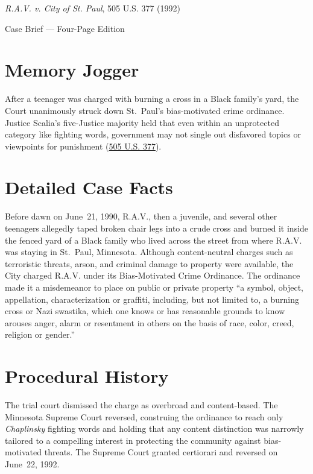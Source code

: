 \documentclass[12pt]{article}
\begin{document}
\begin{center}
{\LARGE \textit{R.A.V. v. City of St. Paul}, 505 U.S. 377 (1992)\par}
\vspace{0.8em}
{\large Case Brief --- Four-Page Edition\par}
\end{center}
\vspace{1em}

\section{Memory Jogger}

After a teenager was charged with burning a cross in a Black family's yard, the Court unanimously struck down St.~Paul's bias-motivated crime ordinance. Justice Scalia's five-Justice majority held that even within an unprotected category like fighting words, government may not single out disfavored topics or viewpoints for punishment (\href{https://supreme.justia.com/cases/federal/us/505/377/}{505 U.S. 377}).

\section{Detailed Case Facts}

Before dawn on June~21, 1990, R.A.V., then a juvenile, and several other teenagers allegedly taped broken chair legs into a crude cross and burned it inside the fenced yard of a Black family who lived across the street from where R.A.V. was staying in St.~Paul, Minnesota. Although content-neutral charges such as terroristic threats, arson, and criminal damage to property were available, the City charged R.A.V. under its Bias-Motivated Crime Ordinance. The ordinance made it a misdemeanor to place on public or private property ``a symbol, object, appellation, characterization or graffiti, including, but not limited to, a burning cross or Nazi swastika, which one knows or has reasonable grounds to know arouses anger, alarm or resentment in others on the basis of race, color, creed, religion or gender.''

\section{Procedural History}

The trial court dismissed the charge as overbroad and content-based. The Minnesota Supreme Court reversed, construing the ordinance to reach only \textit{Chaplinsky} fighting words and holding that any content distinction was narrowly tailored to a compelling interest in protecting the community against bias-motivated threats. The Supreme Court granted certiorari and reversed on June~22, 1992.
\end{document}
